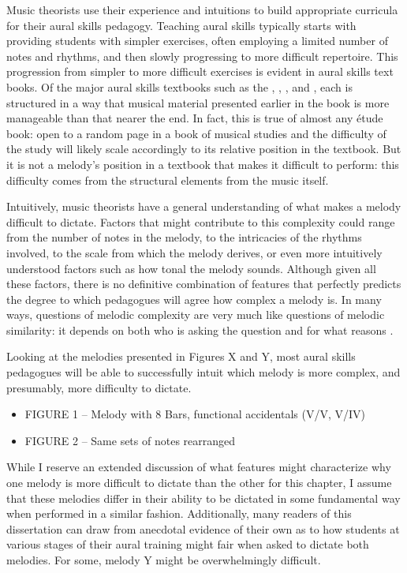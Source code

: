 \documentclass[]{book}
\begin{document}
Music theorists use their experience and intuitions to build appropriate curricula for their aural skills pedagogy.
Teaching aural skills typically starts with providing students with simpler exercises, often employing a limited number of notes and rhythms, and then slowly progressing to more difficult repertoire.
This progression from simpler to more difficult exercises is evident in aural skills text books.
Of the major aural skills textbooks such as the \citet{ottmanMusicSightSinging2014}, \citet{berkowitzNewApproachSight2011}, \citet{karpinskiManualEarTraining2007}, and \citet{clelandDevelopingMusicianshipAural2010}, each is structured in a way that musical material presented earlier in the book is more manageable than that nearer the end.
In fact, this is true of almost any étude book: open to a random page in a book of musical studies and the difficulty of the study will likely scale accordingly to its relative position in the textbook.
But it is not a melody's position in a textbook that makes it difficult to perform: this difficulty comes from the structural elements from the music itself.

Intuitively, music theorists have a general understanding of what makes a melody difficult to dictate.
Factors that might contribute to this complexity could range from the number of notes in the melody, to the intricacies of the rhythms involved, to the scale from which the melody derives, or even more intuitively understood factors such as how tonal the melody sounds.
Although given all these factors, there is no definitive combination of features that perfectly predicts the degree to which pedagogues will agree how complex a melody is.
In many ways, questions of melodic complexity are very much like questions of melodic similarity: it depends on both who is asking the question and for what reasons \citep{cambouropoulosHowSimilarSimilar2009}.

Looking at the melodies presented in Figures X and Y, most aural skills pedagogues will be able to successfully intuit which melody is more complex, and presumably, more difficulty to dictate.

\begin{itemize}
\item
  FIGURE 1 -- Melody with 8 Bars, functional accidentals (V/V, V/IV)
\item
  FIGURE 2 -- Same sets of notes rearranged
\end{itemize}

While I reserve an extended discussion of what features might characterize why one melody is more difficult to dictate than the other for this chapter, I assume that these melodies differ in their ability to be dictated in some fundamental way when performed in a similar fashion.
Additionally, many readers of this dissertation can draw from anecdotal evidence of their own as to how students at various stages of their aural training might fair when asked to dictate both melodies.
For some, melody Y might be overwhelmingly difficult.
\end{document}
